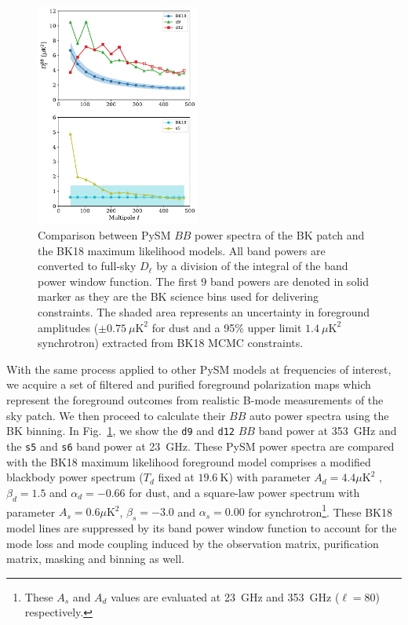 \documentclass[twocolumn]{aastex631}
\begin{document}
\begin{figure}
    \centering
    \includegraphics[width=0.48\textwidth]{figures/BKfield_power.pdf}
    \caption{Comparison between PySM $BB$ power spectra of the BK patch and the BK18 maximum likelihood models. All band powers are converted to full-sky $D_\ell$ by a division of the integral of the band power window function. The first 9 band powers are denoted in solid marker as they are the BK science bins used for delivering constraints. The shaded area represents an uncertainty in foreground amplitudes ($\pm 0.75~\mu\text{K}^2$ for dust and a 95\% upper limit $1.4~\mu\text{K}^2$ synchrotron) extracted from BK18 MCMC constraints.}
    \label{fig:BKfield_power}
\end{figure}

With the same process applied to other PySM models at frequencies of interest, we acquire a set of filtered and purified foreground polarization maps which represent the foreground outcomes from realistic B-mode measurements of the sky patch. We then proceed to calculate their $BB$ auto power spectra using the BK binning. In Fig.~\ref{fig:BKfield_power}, we show the \texttt{d9} and \texttt{d12} $BB$ band power at 353~GHz and the \texttt{s5} and \texttt{s6} band power at 23~GHz. These PySM power spectra are compared with the BK18 maximum likelihood foreground model comprises a modified blackbody power spectrum ($T_d$ fixed at $19.6~\text{K}$) with parameter $A_d = 4.4 \mu\text{K}^2$ , $\beta_d = 1.5$ and $\alpha_d = -0.66$ for dust, and a square-law power spectrum with parameter $A_s = 0.6 \mu\text{K}^2$, $\beta_s = -3.0$ and $\alpha_s = 0.00$ for synchrotron\footnote{These $A_s$ and $A_d$ values are evaluated at 23~GHz and 353~GHz ($\ell = 80$) respectively.}. These BK18 model lines are suppressed by its band power window function to account for the mode loss and mode coupling induced by the observation matrix, purification matrix, masking and binning as well. 
\end{document}
